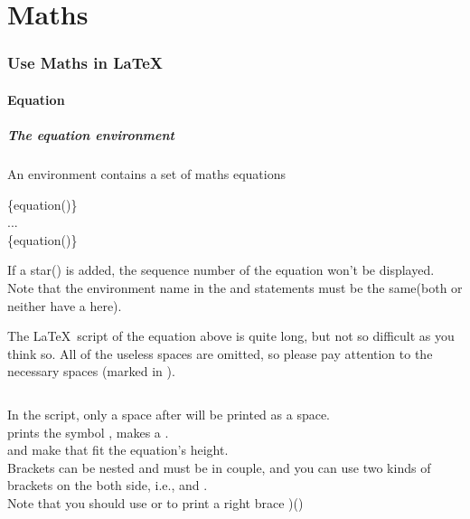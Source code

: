 \part{Maths}

\section{Use Maths in \LaTeX}
\begin{frame}
\end{frame}

\subsection{Equation}

\begin{frame}
	\frametitle{The equation environment}
	An  environment contains a set of maths equations
	\begin{command}
		\{equation(\structure{*})\}\\
		\qquad ...\\
		\{equation(\structure{*})\}\\
	\end{command}
	\begin{example}
		
	\end{example}
	If a star(\structure{*}) is added, the sequence number of the equation won't be displayed. Note that the environment name in the  and  statements must be the same(both or neither have a \structure{*} here).
\end{frame}

\begin{frame}[fragile]
	The \LaTeX\ script of the equation above is quite long, but not so difficult as you think so. All of the useless spaces are omitted, so please pay attention to the necessary spaces (marked in \textvisiblespace).

	
	\inputminted[showspaces]{latex}{examples/curl.tex}
	
	In the script, only a space after \LC{\ }will be printed as a space. \\
	\LC{\partial} prints the symbol \structure{$\partial$},  makes a . \\
	
	\LC{\left(} and \LC{\right(} make  that fit the equation's height. \\
	Brackets can be nested and must be in couple, and you can use two kinds of brackets on the both side, i.e., \LC{\left[} and \LC{\right\rbrace}. \\
	Note that you should use \LC{\rbrace} or \LC{\}} to print a right brace )(\structure{$\rbrace$}) \\
\end{frame}

